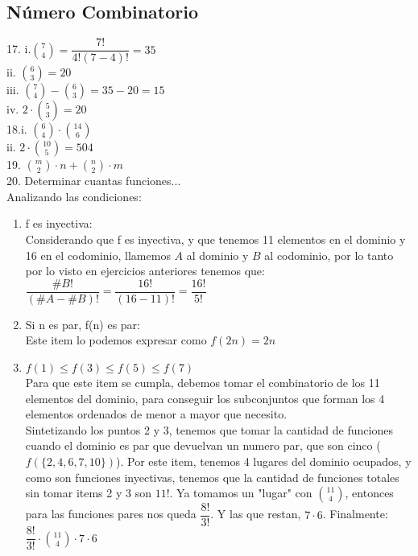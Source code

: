 \documentclass[a4paper,11pt]{article}
\begin{document}
\subsection{Número Combinatorio}
17. i.$ {7 \choose 4}= \dfrac{7!}{4!(7-4)!} = 35$\\
ii. $ {6 \choose 3} = 20$\\
iii. $ {7 \choose 4} - {6 \choose 3} = 35 - 20 = 15$\\
iv. $2 \cdot {5 \choose 3} = 20$\\
18.i. $ {6 \choose 4} \cdot {14 \choose 6}$\\
ii.  $2 \cdot {10 \choose 5} = 504$\\
19. ${m \choose 2} \cdot n + {n \choose 2} \cdot m$\\
20. Determinar cuantas funciones...\\
Analizando las condiciones:
\begin{enumerate}
\item f es inyectiva:\\
Considerando que f es inyectiva, y que tenemos 11 elementos en el dominio y 16 en el codominio, llamemos $A$ al dominio y $B$ al codominio, por lo tanto por lo visto en ejercicios anteriores tenemos que:\\
$\dfrac{\#B!}{(\#A-\#B)!} = \dfrac{16!}{(16-11)!} = \dfrac{16!}{5!}$
\item Si n es par, f(n) es par:\\
Este item lo podemos expresar como $f(2n) = 2n$
\item $f(1)\leqslant f(3)\leqslant f(5)\leqslant f(7)$\\
Para que este item se cumpla, debemos tomar el combinatorio de los 11 elementos del dominio, para conseguir los subconjuntos que forman los 4 elementos ordenados de menor a mayor que necesito.\\
Sintetizando los puntos 2 y 3, tenemos que tomar la cantidad de funciones cuando el dominio es par que devuelvan un numero par, que son cinco ($f(\{2, 4, 6, 7, 10\})$). Por este item, tenemos 4 lugares del dominio ocupados, y como son funciones inyectivas, tenemos que la cantidad de funciones totales sin tomar items 2 y 3 son $11!$. Ya tomamos un "lugar" con $11 \choose 4$, entonces para las funciones pares nos queda $\dfrac{8!}{3!}$. Y las que restan, $7 \cdot 6$. Finalmente:\\
$\dfrac{8!}{3!} \cdot {11 \choose 4} \cdot 7 \cdot 6$\\
\end{enumerate}
\end{document}
